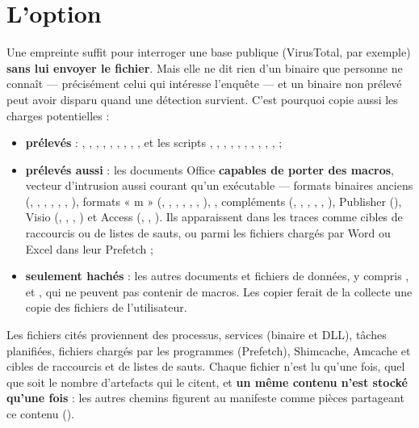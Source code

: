 \documentclass[11pt,a4paper,oneside]{report}
\begin{document}
\section{L'option }\label{sec:binary}

Une empreinte suffit pour interroger une base publique (VirusTotal, par exemple)
\textbf{sans lui envoyer le fichier}. Mais elle ne dit rien d'un binaire que
personne ne connaît — précisément celui qui intéresse l'enquête — et un binaire
non prélevé peut avoir disparu quand une détection survient. C'est pourquoi
 copie aussi les charges potentielles :

\begin{itemize}
  \item \textbf{prélevés} : , , ,
        , , , ,
        , ,  et les scripts
        , , , ,
        , , , ,
        , ,  ;
  \item \textbf{prélevés aussi} : les documents Office \textbf{capables de porter
        des macros}, vecteur d'intrusion aussi courant qu'un exécutable —
        formats binaires anciens (, , ,
        , , , ), formats
        « m » (, , , ,
        , , ), ,
        compléments (, , ,
        , , ), Publisher
        (), Visio (, , ,
        ) et Access (, ,
        ). Ils apparaissent dans les traces comme cibles de
        raccourcis ou de listes de sauts, ou parmi les fichiers chargés par
        Word ou Excel dans leur Prefetch ;
  \item \textbf{seulement hachés} : les autres documents et fichiers de données,
        y compris ,  et , qui ne
        peuvent pas contenir de macros. Les copier ferait de la collecte une
        copie des fichiers de l'utilisateur.
\end{itemize}

Les fichiers cités proviennent des processus, services (binaire et DLL), tâches
planifiées, fichiers chargés par les programmes (Prefetch), Shimcache, Amcache et
cibles de raccourcis et de listes de sauts. Chaque fichier n'est lu qu'une fois, quel que soit le
nombre d'artefacts qui le citent, et \textbf{un même contenu n'est stocké
qu'une fois} : les autres chemins figurent au manifeste comme pièces partageant
ce contenu ().
\end{document}

